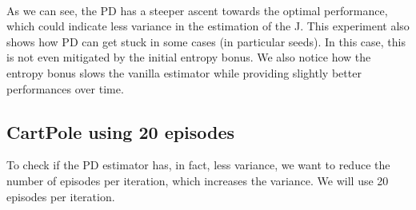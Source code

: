 \documentclass[11pt]{article}
\begin{document}
    \begin{center}
    \end{center}
    { \hspace*{\fill} \\}
    
    As we can see, the PD has a steeper ascent towards the optimal
performance, which could indicate less variance in the estimation of the
J. This experiment also shows how PD can get stuck in some cases (in
particular seeds). In this case, this is not even mitigated by the
initial entropy bonus. We also notice how the entropy bonus slows the
vanilla estimator while providing slightly better performances over
time.

    \hypertarget{cartpole-using-20-episodes}{%
\subsection{CartPole using 20
episodes}\label{cartpole-using-20-episodes}}

To check if the PD estimator has, in fact, less variance, we want to
reduce the number of episodes per iteration, which increases the
variance. We will use 20 episodes per iteration.
\end{document}
